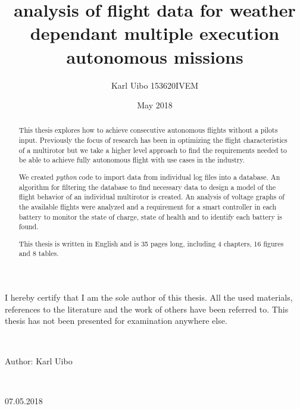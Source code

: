\documentclass[12pt,oneside]{reedthesis}
\title{analysis of flight data for weather dependant multiple execution
autonomous missions}
\author{Karl Uibo 153620IVEM}
\date{May 2018}
\theoremstyle{definition}
\theoremstyle{definition}
\theoremstyle{definition}
\theoremstyle{remark}
\begin{document}
  \maketitle
  \begin{originality}
    I hereby certify that I am the sole author of this thesis. All the used
    materials, references to the literature and the work of others have been
    referred to. This thesis has not been presented for examination anywhere
    else.
    
    ~
    
    Author: Karl Uibo
    
    ~
    
    07.05.2018
  \end{originality}
  \begin{abstract}
    This thesis explores how to achieve consecutive autonomous flights
    without a pilots input. Previously the focus of research has been in
    optimizing the flight characteristics of a multirotor but we take a
    higher level approach to find the requirements needed to be able to
    achieve fully autonomous flight with use cases in the industry.
    
    We created \emph{python} code to import data from individual log files
    into a database. An algorithm for filtering the database to find
    necessary data to design a model of the flight behavior of an individual
    multirotor is created. An analysis of voltage graphs of the available
    flights were analyzed and a requirement for a smart controller in each
    battery to monitor the state of charge, state of health and to identify
    each battery is found.
    
    This thesis is written in English and is 35 pages long, including 4
    chapters, 16 figures and 8 tables.
  \end{abstract}
\end{document}
